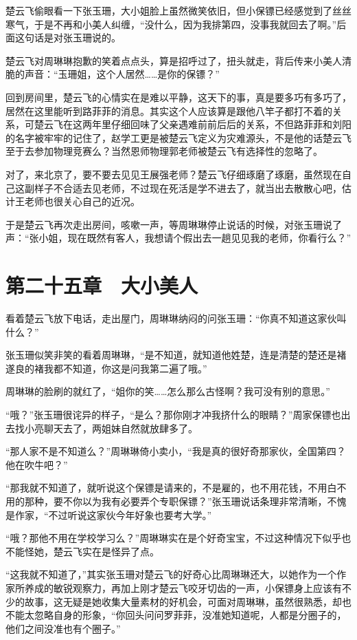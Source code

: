楚云飞偷眼看一下张玉珊，大小姐脸上虽然微笑依旧，但小保镖已经感觉到了丝丝寒气，于是不再和小美人纠缠，“没什么，因为我排第四，没事我就回去了啊。”后面这句话是对张玉珊说的。

楚云飞对周琳琳抱歉的笑着点点头，算是招呼过了，扭头就走，背后传来小美人清脆的声音：“玉珊姐，这个人居然……是你的保镖？”

回到房间里，楚云飞的心情实在是难以平静，这天下的事，真是要多巧有多巧了，居然在这里能听到路菲菲的消息。其实这个人应该算是跟他八竿子都打不着的关系，可楚云飞在这两年里仔细回味了父亲遇难前前后后的关系，不但路菲菲和刘阳的名字被牢牢的记住了，赵学工更是被楚云飞定义为灾难源头，不是他的话楚云飞至于去参加物理竞赛么？当然恩师物理郭老师被楚云飞有选择性的忽略了。

对了，来北京了，要不要去见见王展强老师？楚云飞仔细琢磨了琢磨，虽然现在自己这副样子不合适去见老师，不过现在死活是学不进去了，就当出去散散心吧，估计王老师也很关心自己的近况。

于是楚云飞再次走出房间，咳嗽一声，等周琳琳停止说话的时候，对张玉珊说了声：“张小姐，现在既然有客人，我想请个假出去一趟见见我的老师，你看行么？”

\section{第二十五章　大小美人}

看着楚云飞放下电话，走出屋门，周琳琳纳闷的问张玉珊：“你真不知道这家伙叫什么？”

张玉珊似笑非笑的看着周琳琳，“是不知道，就知道他姓楚，连是清楚的楚还是褚遂良的褚我都不知道，你这是问我第二遍了哦。”

周琳琳的脸刷的就红了，“姐你的笑……怎么那么古怪啊？我可没有别的意思。”

“哦？”张玉珊很诧异的样子，“是么？那你刚才冲我挤什么的眼睛？”周家保镖也出去找小亮聊天去了，两姐妹自然就放肆多了。

“那人家不是不知道么？”周琳琳倚小卖小，“我是真的很好奇那家伙，全国第四？他在吹牛吧？”

“那我就不知道了，就听说这个保镖是请来的，不是雇的，也不用花钱，不用白不用的那种，要不你以为我有必要弄个专职保镖？”张玉珊说话条理非常清晰，不愧是作家，“不过听说这家伙今年好象也要考大学。”

“哦？那他不用在学校学习么？”周琳琳实在是个好奇宝宝，不过这种情况下似乎也不能怪她，楚云飞实在是怪异了点。

“这我就不知道了，”其实张玉珊对楚云飞的好奇心比周琳琳还大，以她作为一个作家所养成的敏锐观察力，再加上刚才楚云飞咬牙切齿的一声，小保镖身上应该有不少的故事，这无疑是她收集大量素材的好机会，可面对周琳琳，虽然很熟悉，却也不能太忽略自身的形象，“你回头问问罗菲菲，没准她知道呢，人都是分圈子的，他们之间没准也有个圈子。”

